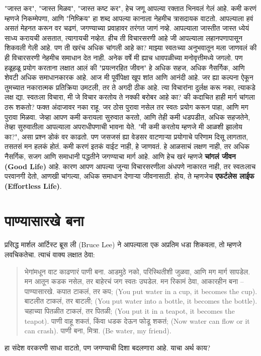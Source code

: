  "जास्त कर", "जास्त मिळव", "जास्त कष्ट कर",  हेच जणू आपल्या रक्तात भिनवलं गेलं आहे.
 कमी करणं म्हणजे निकम्मेपणा, आणि "निष्क्रिय" हा शब्द आपल्या कानाला नेहमीच त्रासदायक वाटतो. आपल्याला हवं असतं मेहनत करून वर चढणं, जगण्याच्या प्रवाहावर तरंगत जाणं नव्हे. आपल्याला जास्तीत जास्त ध्येयं साध्य करायची असतात, त्यागायची नव्हेत.
हीच ती विचारसरणी आहे जी आपल्याला लहानपणापासून शिकवली गेली आहे. पण ती खरंच अधिक चांगली आहे का? माझ्या स्वतःच्या अनुभवातून मला जाणवलं की ही विचारसरणी नेहमीच समाधान देत नाही. अनेक वर्षे मी ह्याच धावपळीच्या मनोवृत्तीमध्ये जगलो. पण हळूहळू प्रयोग करताना लक्षात आलं की "प्रयत्नरहित जीवन" हे अधिक सहज, अधिक नैसर्गिक, आणि शेवटी अधिक समाधानकारक आहे. आज मी पूर्वीपेक्षा खूप शांत आणि आनंदी आहे.
जर ह्या कल्पना ऐकून तुमच्यात नकारात्मक प्रतिक्रिया उमटली, तर ते अगदी ठीक आहे. त्या विचारांना दुर्लक्ष करू नका, त्याकडे लक्ष द्या. स्वतःला विचारा, मी जे विचार करतोय ते नक्की बरोबर आहे का? की कदाचित हाही मार्ग चांगला ठरू शकतो? फक्त अंदाजावर नका राहू. जर ठोस पुरावा नसेल तर स्वतः प्रयोग करून पाहा, आणि मग पुरावा मिळवा.
जेव्हा आपण कमी करायला सुरुवात करतो, आणि तेही कमी धडपडीत, अधिक सहजतेने, तेव्हा सुरुवातीला आपल्याला अपराधीपणाची भावना येते. "मी कमी करतोय म्हणजे मी आळशी झालोय का?",  असा प्रश्न डोकं वर काढतो. पण जसजसं ह्या वेडसर वाटणाऱ्या प्रयोगाचे परिणाम दिसू लागतात, तसतसं मन हलकं होतं.
 कमी करणं इतकं वाईट नाही, हे जाणवतं. हे आळसाचं लक्षण नाही, तर अधिक नैसर्गिक, सजग आणि समाधानी पद्धतीने जगण्याचा मार्ग आहे.
आणि हेच खरं म्हणजे \textbf{चांगलं जीवन (Good Life)} आहे. कारण आपण आपल्या जुन्या विचारसरणीला अंधपणे नाकारत नाही, तर स्वतःलाच परवानगी देतो,  आणखी चांगल्या, अधिक समाधान देणाऱ्या जीवनासाठी.
 होय, ते म्हणजेच \textbf{एफर्टलेस लाईफ (Effortless Life)}.
 \chapter{पाण्यासारखे बना}
प्रसिद्ध मार्शल आर्टिस्ट ब्रूस ली (Bruce Lee) ने आपल्याला एक अप्रतिम धडा शिकवला, तो म्हणजे लवचिकतेचा.
 त्याचं वाक्य लक्षात ठेवा:
 \begin{quote}
भेगांमधून वाट काढणारं पाणी बना.
 आडमुठे नको, परिस्थितीशी जुळवा,
 आणि मग मार्ग सापडेल.
 मन आतून कडक नसेल,
 तर बाहेरचं जग स्वतः उघडेल.
मन रिकामं ठेवा, आकारहीन बना –
 पाण्यासारखे.
 कपात टाकलं, तर कप;
 (You put water in a cup, it becomes the cup).
 बाटलीत टाकलं, तर बाटली;
 (You put water into a bottle, it becomes the bottle).
 चहाच्या पितळीत टाकलं, तर पितळी;
 (You put it in a teapot, it becomes the teapot).
पाणी वाहू शकतं,
 किंवा धडक देऊन फोडू शकतं;
 (Now water can flow or it can crash).
 पाणी बना, मित्रा.
 (Be water, my friend).
 \end{quote}
हा संदेश वरकरणी साधा वाटतो, पण जगण्याची दिशा बदलणारा आहे. याचा अर्थ काय?

